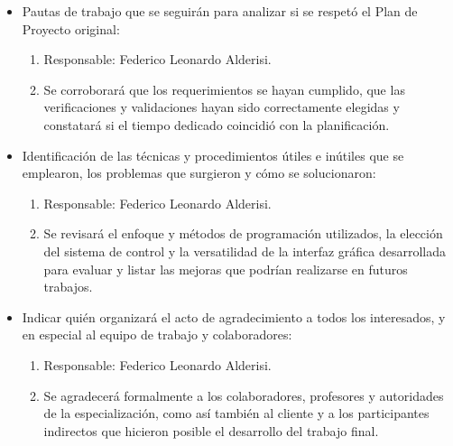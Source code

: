 \documentclass[
11pt, %
]{charter}
\begin{document}
\begin{itemize}
	\item Pautas de trabajo que se seguirán para analizar si se respetó el Plan de Proyecto original:
		\begin{enumerate}
		\item Responsable: Federico Leonardo Alderisi.
		\item Se corroborará que los requerimientos se hayan cumplido, que las verificaciones y validaciones hayan sido correctamente elegidas y constatará si el tiempo dedicado coincidió con la planificación.
		\end{enumerate}		 
	\item Identificación de las técnicas y procedimientos útiles e inútiles que se emplearon, los problemas que surgieron y cómo se solucionaron:
		\begin{enumerate}
		\item Responsable: Federico Leonardo Alderisi.
		\item Se revisará el enfoque y métodos de programación utilizados, la elección del sistema de control y la versatilidad de la interfaz gráfica desarrollada para evaluar y listar las mejoras que podrían realizarse en futuros trabajos.
		\end{enumerate}	
	\item Indicar quién organizará el acto de agradecimiento a todos los interesados, y en especial al equipo de trabajo y colaboradores:
		\begin{enumerate}
		\item Responsable: Federico Leonardo Alderisi.
		\item Se agradecerá formalmente a los colaboradores, profesores y autoridades de la especialización, como así también al cliente y a los participantes indirectos que hicieron posible el desarrollo del trabajo final.
		\end{enumerate}	
\end{itemize}	  
	  
\end{document}
